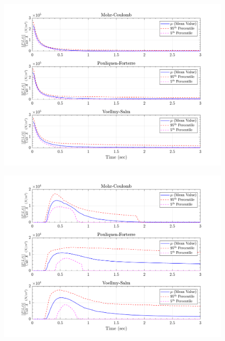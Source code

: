 \documentclass{article}
\begin{document}
\begin{figure}[H]
	\begin{minipage}[b]{0.5\linewidth}
    	\centering
    	\includegraphics[width=1\textwidth]{InclinedPlane/LocalRecords/Records/Fg_L1.png}
    	\label{fig:Ramp-L1-Fg}
	\end{minipage}
	\begin{minipage}[b]{0.5\linewidth}
		\centering
		\includegraphics[width=1\textwidth]{InclinedPlane/LocalRecords/Records/Fg_L8.png}
    	\label{fig:Ramp-L2-Fg}
    \end{minipage}


\end{figure}
\end{document}
